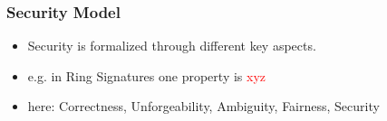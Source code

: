 \begin{frame}
	\frametitle{Security Model}

	\begin{itemize}
		\item Security is formalized through different key aspects.
		\item e.g. in Ring Signatures one property is \textcolor{red}{xyz}
		\item here: Correctness, Unforgeability, Ambiguity, Fairness, Security
	\end{itemize}
\end{frame}